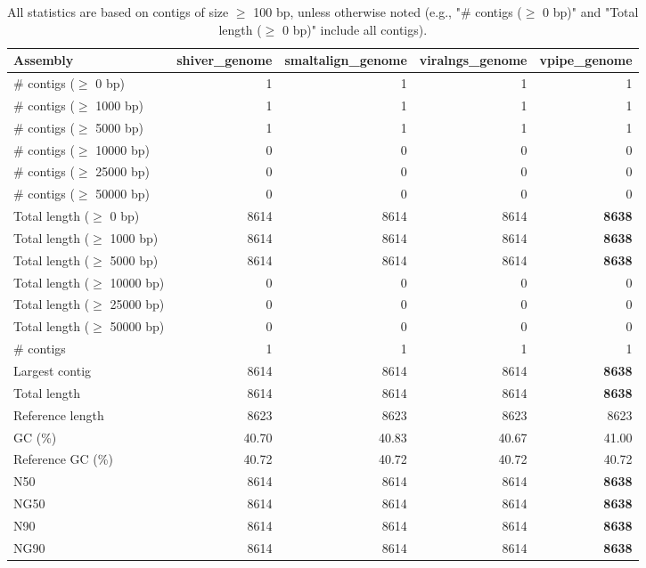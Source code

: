\documentclass[12pt,a4paper]{article}
\begin{document}
\begin{table}[ht]
\begin{center}
\caption{All statistics are based on contigs of size $\geq$ 100 bp, unless otherwise noted (e.g., "\# contigs ($\geq$ 0 bp)" and "Total length ($\geq$ 0 bp)" include all contigs).}
\begin{tabular}{|l*{4}{|r}|}
\hline
Assembly & shiver\_genome & smaltalign\_genome & viralngs\_genome & vpipe\_genome \\ \hline
\# contigs ($\geq$ 0 bp) & 1 & 1 & 1 & 1 \\ \hline
\# contigs ($\geq$ 1000 bp) & 1 & 1 & 1 & 1 \\ \hline
\# contigs ($\geq$ 5000 bp) & 1 & 1 & 1 & 1 \\ \hline
\# contigs ($\geq$ 10000 bp) & 0 & 0 & 0 & 0 \\ \hline
\# contigs ($\geq$ 25000 bp) & 0 & 0 & 0 & 0 \\ \hline
\# contigs ($\geq$ 50000 bp) & 0 & 0 & 0 & 0 \\ \hline
Total length ($\geq$ 0 bp) & 8614 & 8614 & 8614 & {\bf 8638} \\ \hline
Total length ($\geq$ 1000 bp) & 8614 & 8614 & 8614 & {\bf 8638} \\ \hline
Total length ($\geq$ 5000 bp) & 8614 & 8614 & 8614 & {\bf 8638} \\ \hline
Total length ($\geq$ 10000 bp) & 0 & 0 & 0 & 0 \\ \hline
Total length ($\geq$ 25000 bp) & 0 & 0 & 0 & 0 \\ \hline
Total length ($\geq$ 50000 bp) & 0 & 0 & 0 & 0 \\ \hline
\# contigs & 1 & 1 & 1 & 1 \\ \hline
Largest contig & 8614 & 8614 & 8614 & {\bf 8638} \\ \hline
Total length & 8614 & 8614 & 8614 & {\bf 8638} \\ \hline
Reference length & 8623 & 8623 & 8623 & 8623 \\ \hline
GC (\%) & 40.70 & 40.83 & 40.67 & 41.00 \\ \hline
Reference GC (\%) & 40.72 & 40.72 & 40.72 & 40.72 \\ \hline
N50 & 8614 & 8614 & 8614 & {\bf 8638} \\ \hline
NG50 & 8614 & 8614 & 8614 & {\bf 8638} \\ \hline
N90 & 8614 & 8614 & 8614 & {\bf 8638} \\ \hline
NG90 & 8614 & 8614 & 8614 & {\bf 8638} \\ \hline

\end{tabular}
\end{center}
\end{table}
\end{document}
